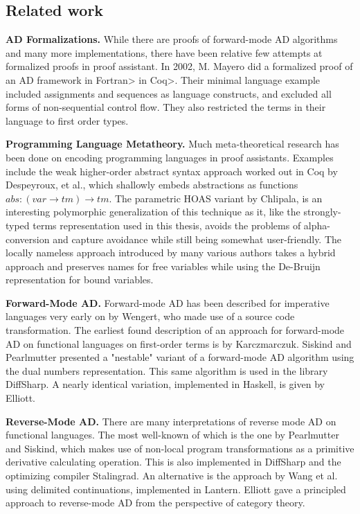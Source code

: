 \subsection{Related work}
\textbf{AD Formalizations.} While there are proofs of forward-mode AD algorithms\cite{huot2020correctness}\cite{barthe2020versatility} and many more implementations\cite{Shaikha2019}\cite{Margossian2019ARO}, there have been relative few attempts at formalized proofs in proof assistant.
In 2002, M. Mayero did a formalized proof of an AD framework in \<Fortran> in \<Coq>\cite{Mayero:CorrectnessProofAD}.
Their minimal language example included assignments and sequences as language constructs, and excluded all forms of non-sequential control flow.
They also restricted the terms in their language to first order types.

\textbf{Programming Language Metatheory.} Much meta-theoretical research has been done on encoding programming languages in proof assistants\cite{Aydemir2005}.
Examples include the weak higher-order abstract syntax approach worked out in Coq by Despeyroux, et al.\cite{10.1007/BFb0014049}, which shallowly embeds abstractions as functions $abs : (var \to tm) \to tm$.
The parametric HOAS variant by Chlipala\cite{10.1145/1411204.1411226}, is an interesting polymorphic generalization of this technique as it, like the strongly-typed terms representation used in this thesis, avoids the problems of alpha-conversion and capture avoidance while still being somewhat user-friendly.
The locally nameless approach introduced by many various authors\cite{McKinna_Pollack_1997}\cite{10.1007/3-540-57826-9_152}\cite{10.1145/1017472.1017477} takes a hybrid approach and preserves names for free variables while using the De-Bruijn representation for bound variables.

\textbf{Forward-Mode AD.} Forward-mode AD has been described for imperative languages very early on by Wengert\cite{10.1145/355586.364791}, who made use of a source code transformation.
The earliest found description of an approach for forward-mode AD on functional languages on first-order terms is by Karczmarczuk\cite{Karczmarczuk98functionaldifferentiation}.
Siskind and Pearlmutter presented a "nestable" variant of a forward-mode AD algorithm using the dual numbers representation.
This same algorithm is used in the library DiffSharp\cite{Baydin2015AutomaticDI}.
A nearly identical variation, implemented in Haskell, is given by Elliott\cite{Elliott2009-beautiful-differentiation}.

\textbf{Reverse-Mode AD.} There are many interpretations of reverse mode AD on functional languages.
The most well-known of which is the one by Pearlmutter and Siskind\cite{PearlmutterSiskind2008}, which makes use of non-local program transformations as a primitive derivative calculating operation.
This is also implemented in DiffSharp and the optimizing compiler Stalingrad.
An alternative is the approach by Wang et al. using delimited continuations\cite{ShiftReset:Backprop}, implemented in Lantern.
Elliott gave a principled approach to reverse-mode AD from the perspective of category theory\cite{Elliott-2018-ad-icfp}.

